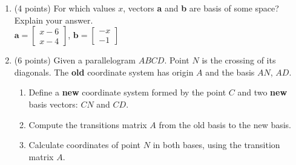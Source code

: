 \documentclass[]{exam}
\begin{document}
\begin{enumerate}
\item (4 points) For which values $x$, vectors \textbf{a} and \textbf{b} are basis of some space? Explain your answer. \\
$\textbf{a} =  \begin{bmatrix} x-6 \\ x-4  \end{bmatrix}$,
$\textbf{b} =  \begin{bmatrix} -x \\ -1     \end{bmatrix}$
\medskip


\item (6 points) Given a parallelogram $ABCD$. Point $N$ is the crossing of its diagonals. The \textbf{old} coordinate system has origin $A$ and the basis  $AN$, $AD$.

\begin{enumerate}
    \item Define a \textbf{new} coordinate system formed by the point $C$ and two \textbf{new} basis vectors: $CN$ and $CD$. 
    \item Compute the transitions matrix $A$ from the old basis to the new basis.
    \item Calculate coordinates of point $N$ in both bases, using the transition matrix $A$.
\end{enumerate}



\medskip



\end{enumerate}
\end{document}
